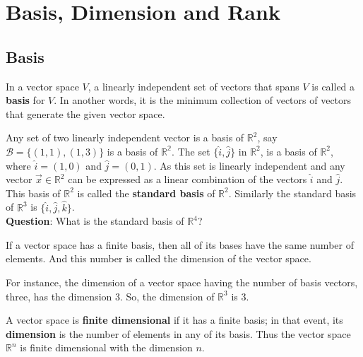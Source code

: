 \documentclass[math101_lecturenotes_ku.tex]{subfiles}
\begin{document}
\section{Basis, Dimension and Rank}
\subsection{Basis}
    In a vector space $V$, a linearly independent set of vectors that spans $V$ is called a \textbf{basis} for $V$. In another words, it is the minimum collection of vectors of vectors that generate the given vector space.

    \begin{example}
      Any set of two linearly independent vector is a basis of \(\mathbb{R}^2\), say \(\mathcal{B} = \{(1,1), (1,3)\}\) is a basis of \(\mathbb{R^2}\). The set $\{\hat{i}, \hat{j}\}$ in $\mathbb{R}^2$, is a basis of \(\mathbb{R}^2\), where \(\hat{i}=(1,0)\) and \(\hat{j}=(0,1)\). As this set is linearly independent and any vector $\vec{x} \in \mathbb{R}^2$ can be expressed as a linear combination of the vectors $\hat{i}$ and $\hat{j}$. This basis of \(\mathbb{R}^2\) is called the \textbf{standard basis} of \(\mathbb{R}^2\). Similarly the standard basis of \(\mathbb{R}^3\) is \(\{\hat{i}, \hat{j}, \hat{k}\}\). \\[2mm]
  \textbf{Question}: What is the standard basis of \(\mathbb{R}^4\)?
\end{example}

\begin{theorem}
    If a vector space has a finite basis, then all of its bases have the same number of elements. And this number is called the dimension of the vector space.
  \end{theorem}
 For instance, the dimension of a vector space having the number of basis vectors, three, has the dimension 3. So, the dimension of \(\mathbb{R}^{3}\) is 3.

\begin{definition}
    A vector space is \textbf{finite dimensional} if it has a finite basis; in that event, its \textbf{dimension} is the number of elements in any of its basis. Thus the vector space $\mathbb{R}^n$ is finite dimensional with the dimension $n$.
\end{definition}
\end{document}
